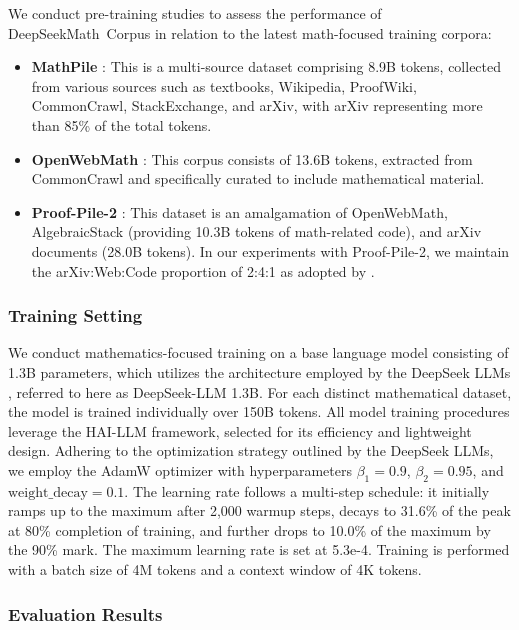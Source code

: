 We conduct pre-training studies to assess the performance of DeepSeekMath~Corpus in relation to the latest math-focused training corpora:

\begin{itemize}[topsep=0pt]
    \item \textbf{MathPile} \citep{mathpile}: This is a multi-source dataset comprising 8.9B tokens, collected from various sources such as textbooks, Wikipedia, ProofWiki, CommonCrawl, StackExchange, and arXiv, with arXiv representing more than 85\% of the total tokens.
    \item \textbf{OpenWebMath} \citep{openwebmath}: This corpus consists of 13.6B tokens, extracted from CommonCrawl and specifically curated to include mathematical material.
    \item \textbf{Proof-Pile-2} \citep{llemma}: This dataset is an amalgamation of OpenWebMath, AlgebraicStack (providing 10.3B tokens of math-related code), and arXiv documents (28.0B tokens). In our experiments with Proof-Pile-2, we maintain the arXiv:Web:Code proportion of 2:4:1 as adopted by \cite{llemma}.
\end{itemize}

\subsubsection{Training Setting}
\label{sec:quality-policy}
We conduct mathematics-focused training on a base language model consisting of 1.3B parameters, which utilizes the architecture employed by the DeepSeek LLMs \citep{deepseek-llm}, referred to here as DeepSeek-LLM 1.3B. For each distinct mathematical dataset, the model is trained individually over 150B tokens. All model training procedures leverage the HAI-LLM \citep{haillm} framework, selected for its efficiency and lightweight design. Adhering to the optimization strategy outlined by the DeepSeek LLMs, we employ the AdamW optimizer \citep{adamW} with hyperparameters $\beta_1=0.9$, $\beta_2=0.95$, and $\mathrm{weight\_decay}=0.1$. The learning rate follows a multi-step schedule: it initially ramps up to the maximum after 2,000 warmup steps, decays to 31.6\% of the peak at 80\% completion of training, and further drops to 10.0\% of the maximum by the 90\% mark. The maximum learning rate is set at 5.3e-4. Training is performed with a batch size of 4M tokens and a context window of 4K tokens.

\subsubsection{Evaluation Results}

